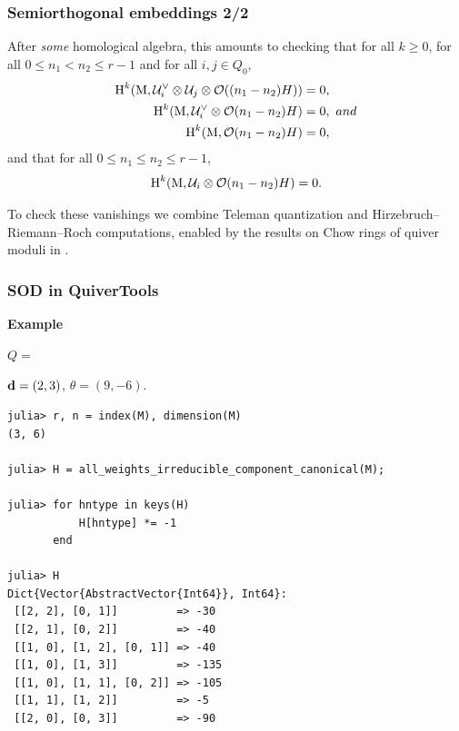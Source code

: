 \documentclass{beamer}
\begin{document}
\begin{frame}
    \frametitle{Semiorthogonal embeddings 2/2}

After \emph{some} homological algebra, this amounts to checking that for all $k \geq 0$,
for all $0 \leq n_1 < n_2 \leq r-1$ and for all $i,j \in Q_0$,
\begin{align}
    \operatorname{H}^k(\operatorname{M}, \mathcal{U}^\vee_i \otimes \mathcal{U}_j \otimes \mathcal{O}((n_1 - n_2)H)) &= 0, \label{equation:needed-UidualUjH}\\
    \operatorname{H}^k(\operatorname{M}, \mathcal{U}^\vee_i \otimes \mathcal{O}(n_1 - n_2)H) &= 0,\ and \label{equation:needed-UidualH}\\
    \operatorname{H}^k(\operatorname{M}, \mathcal{O}(n_1 - n_2)H) &= 0, \label{equation:needed-H}
\end{align}
and that for all $0 \leq n_1 \leq n_2 \leq r-1$,
\begin{equation}
    \operatorname{H}^k(\operatorname{M}, \mathcal{U}_i \otimes \mathcal{O}(n_1 - n_2)H) = 0. \label{equation:needed-UiH}
\end{equation} \pause

To check these vanishings we combine Teleman quantization
and Hirzebruch--Riemann--Roch computations, enabled by the results
on Chow rings of quiver moduli in \cite{MR3318266,chow-paper}.
\end{frame}

\begin{frame}[fragile]
    \frametitle{SOD in QuiverTools}
\textbf{Example}
\begin{center}

    $Q = $
    $\mathbf{d} = (2, 3)$, $\theta = (9, -6)$. \pause
\end{center}  
\scriptsize{
\begin{lstlisting}
julia> r, n = index(M), dimension(M)
(3, 6)

julia> H = all_weights_irreducible_component_canonical(M);

julia> for hntype in keys(H)
           H[hntype] *= -1
       end

julia> H
Dict{Vector{AbstractVector{Int64}}, Int64}:
 [[2, 2], [0, 1]]         => -30
 [[2, 1], [0, 2]]         => -40
 [[1, 0], [1, 2], [0, 1]] => -40
 [[1, 0], [1, 3]]         => -135
 [[1, 0], [1, 1], [0, 2]] => -105
 [[1, 1], [1, 2]]         => -5
 [[2, 0], [0, 3]]         => -90
\end{lstlisting}
}
\end{frame}
\end{document}

